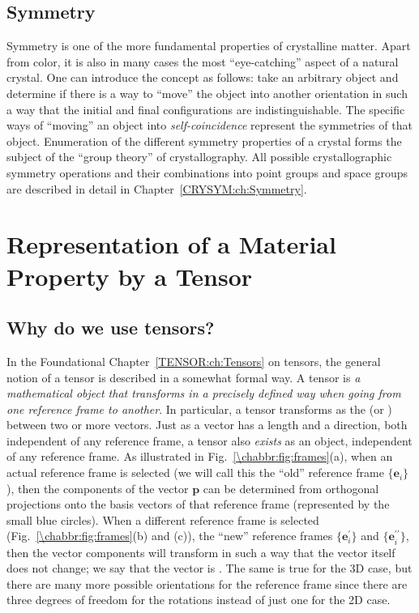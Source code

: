 \subsection{Symmetry}\label{\chabbr:ssec:symmetry}

Symmetry is one of the more fundamental properties of crystalline matter.  Apart from color, it is also in many cases the most ``eye-catching'' aspect of a natural crystal.  One can introduce the concept as follows: take an arbitrary object and determine if there is a way to ``move'' the object into another orientation in such a way that the initial and final configurations are indistinguishable.  The specific ways of ``moving'' an object into \textit{self-coincidence} represent the symmetries of that object.  Enumeration of the different symmetry properties of a crystal forms the subject of the ``group theory'' of crystallography.  All possible crystallographic symmetry operations and their combinations into point groups and space groups are described in detail in Chapter~\ref{CRYSYM:ch:Symmetry}.


\section{Representation of a Material Property by a Tensor}\label{\chabbr:sec:proptensor}

\subsection{Why do we use tensors?}\label{\chabbr:ssec:whytensors}
In the Foundational Chapter~\ref{TENSOR:ch:Tensors} on tensors, the general notion of a tensor is described in a somewhat formal way.  A tensor is \textit{a mathematical object that transforms in a precisely defined way when going from one reference frame to another}. In particular, a tensor transforms as the  (or ) between two or more vectors.  Just as a vector has a length and a direction, both independent of any reference frame, a tensor also \textit{exists} as an object, independent of any reference frame.  As illustrated in Fig.~\ref{\chabbr:fig:frames}(a), when an actual reference frame is selected (we will call this the ``old'' reference frame $\{\mathbf{e}_i\}$), then the components of the vector $\mathbf{p}$ can be determined from orthogonal projections onto the basis vectors of that reference frame (represented by the small blue circles).  When a different reference frame is selected (Fig.~\ref{\chabbr:fig:frames}(b) and (c)), the ``new'' reference frames $\{\mathbf{e}^{\prime}_i\}$ and $\{\mathbf{e}^{\prime\prime}_i\}$, then the vector components will transform in such a way that the vector itself does not change; we say that the vector is .  The same is true for the 3D case, but there are many more possible orientations for the reference frame since there are three degrees of freedom for the rotations instead of just one for the 2D case.

